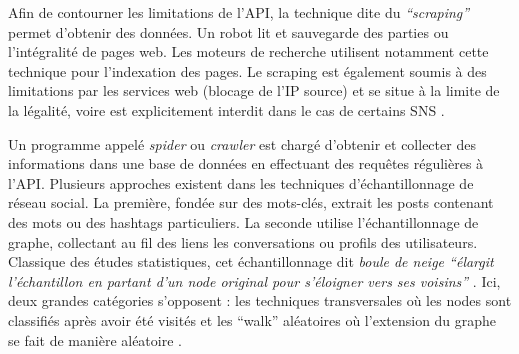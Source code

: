 Afin de contourner les limitations de l{\textquoteright}API, la technique dite du \textit{{\textquotedblleft}scraping{\textquotedblright} }permet d{\textquoteright}obtenir des données. Un robot lit et sauvegarde des parties ou l{\textquoteright}intégralité de pages web. Les moteurs de recherche utilisent notamment cette technique pour l{\textquoteright}indexation des pages. Le scraping est également soumis à des limitations par les services web (blocage de l{\textquoteright}IP source) et se situe à la limite de la légalité, voire est explicitement interdit dans le cas de certains SNS \citep{Petschulat2010}.

Un programme appelé \textit{spider }ou \textit{crawler} est chargé d'obtenir et collecter des informations dans une base de données en effectuant des requ\^etes régulières à l{\textquoteright}API. Plusieurs approches existent dans les techniques d'échantillonnage de réseau social. La première, fondée sur des mots-clés, extrait les posts contenant des mots ou des hashtags particuliers. La seconde utilise l{\textquoteright}échantillonnage de graphe, collectant au fil des liens les conversations ou profils des utilisateurs. Classique des études statistiques, cet échantillonnage dit \textit{boule de neige {\textquotedblleft}élargit l{\textquoteright}échantillon en partant d{\textquoteright}un node original pour s{\textquoteright}éloigner vers ses voisins{\textquotedblright}} \citep{Rothenberg1995}. Ici, deux grandes catégories s{\textquoteright}opposent : les techniques transversales o\`u les nodes sont classifiés après avoir été visités et les {\textquotedblleft}walk{\textquotedblright} aléatoires o\`u l{\textquoteright}extension du graphe se fait de manière aléatoire \citep{Gjoka2011}.


